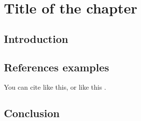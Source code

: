 \chapter{Title of the chapter}
\section{Introduction}
\section{References examples}
You can cite like this\cite{RefA}, or like this \cite{RefA,RefB,RefC}.
\section{Conclusion}